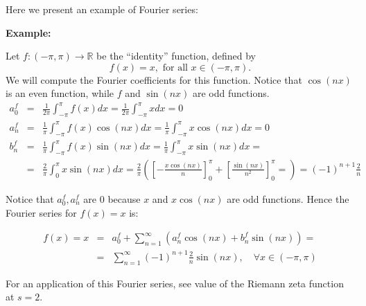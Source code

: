 \documentclass[12pt]{article}
\newcommand{\Reals}{\mathbb{R}}
\begin{document}
Here we present an example of Fourier series:

{\bf Example:}

Let $f\colon (-\pi,\pi) \to \Reals$ be the ``identity'' function,
defined by
$$f(x)=x, \text{ for all }x\in (-\pi,\pi).$$
We will compute the Fourier coefficients for this function. Notice
that $\cos(nx)$ is an even function, while $f$ and $\sin(nx)$ are
odd functions.
\begin{eqnarray*}
a_0^f & =&
\frac{1}{2\pi}\int_{-\pi}^{\pi}f(x)dx=\frac{1}{2\pi}\int_{-\pi}^{\pi}
x dx= 0\\
a_n^f &=& \frac{1}{\pi}\int_{-\pi}^{\pi}f(x)\cos(nx)dx=
\frac{1}{\pi}\int_{-\pi}^{\pi}x \cos(nx)dx = 0\\
b_n^f &=&
\frac{1}{\pi}\int_{-\pi}^{\pi}f(x)\sin(nx)dx=\frac{1}{\pi}\int_{-\pi}^{\pi}
x \sin(nx)dx =\\
&=& \frac{2}{\pi}\int_{0}^{\pi} x\sin(nx) dx= \frac{2}{\pi}\left(
\left[-\frac{x\cos(nx)}{n}\right]_0^{\pi}+\left[\frac{\sin(nx)}{n^2}\right]_0^{\pi}=
\right)=(-1)^{n+1}\frac{2}{n}
\end{eqnarray*}

Notice that $a_0^f,a_n^f$ are $0$ because $x$ and $x \cos(nx)$ are
odd functions. Hence the Fourier series for $f(x)=x$ is:

\begin{eqnarray*}
 f(x)=x &=& a_0^f +
\sum_{n=1}^{\infty}(a_n^f\cos(nx)+b_n^f\sin(nx)) =\\
&=& \sum_{n=1}^{\infty}(-1)^{n+1}\frac{2}{n} \sin(nx), \quad \forall x\in (-\pi,\pi)
\end{eqnarray*}

For an application of this Fourier series, see value of the
Riemann zeta function at $s=2$.
\end{document}
